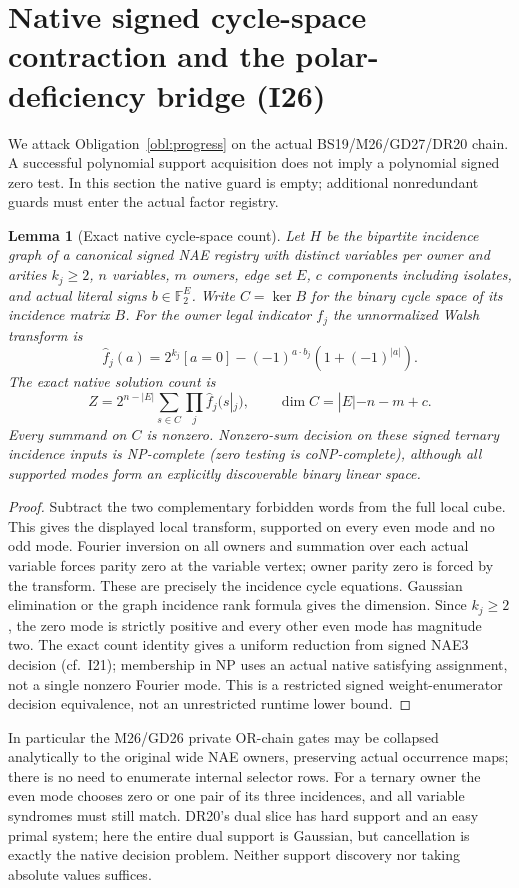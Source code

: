 \documentclass[11pt]{article}
\newtheorem{lemma}[theorem]{Lemma}
\begin{document}
\section{Native signed cycle-space contraction and the polar-deficiency bridge (I26)}\label{sec:i26}
We attack Obligation~\ref{obl:progress} on the actual BS19/M26/GD27/DR20 chain. A successful polynomial support acquisition does not imply a polynomial signed zero test. In this section the native guard is empty; additional nonredundant guards must enter the actual factor registry.
\begin{lemma}[Exact native cycle-space count]\label{lem:i26-cycle}
Let $H$ be the bipartite incidence graph of a canonical signed NAE registry with distinct variables per owner and arities $k_j\ge2$, $n$ variables, $m$ owners, edge set $E$, $c$ components including isolates, and actual literal signs $b\in\mathbb F_2^E$. Write $C=\ker B$ for the binary cycle space of its incidence matrix $B$. For the owner legal indicator $f_j$ the unnormalized Walsh transform is
\[
\widehat f_j(a)=2^{k_j}[a=0]-(-1)^{a\cdot b_j}(1+(-1)^{|a|}).
\]
The exact native solution count is
\[
Z=2^{n-|E|}\sum_{s\in C}\prod_j\widehat f_j(s|_j),\qquad
\dim C=|E|-n-m+c.
\]
Every summand on $C$ is nonzero. Nonzero-sum decision on these signed ternary incidence inputs is NP-complete (zero testing is coNP-complete), although all supported modes form an explicitly discoverable binary linear space.
\end{lemma}
\begin{proof}
Subtract the two complementary forbidden words from the full local cube. This gives the displayed local transform, supported on every even mode and no odd mode. Fourier inversion on all owners and summation over each actual variable forces parity zero at the variable vertex; owner parity zero is forced by the transform. These are precisely the incidence cycle equations. Gaussian elimination or the graph incidence rank formula gives the dimension. Since $k_j\ge2$, the zero mode is strictly positive and every other even mode has magnitude two. The exact count identity gives a uniform reduction from signed NAE3 decision (cf.\ I21); membership in NP uses an actual native satisfying assignment, not a single nonzero Fourier mode. This is a restricted signed weight-enumerator decision equivalence, not an unrestricted runtime lower bound.
\end{proof}
In particular the M26/GD26 private OR-chain gates may be collapsed analytically to the original wide NAE owners, preserving actual occurrence maps; there is no need to enumerate internal selector rows. For a ternary owner the even mode chooses zero or one pair of its three incidences, and all variable syndromes must still match. DR20's dual slice has hard support and an easy primal system; here the entire dual support is Gaussian, but cancellation is exactly the native decision problem. Neither support discovery nor taking absolute values suffices.
\end{document}
